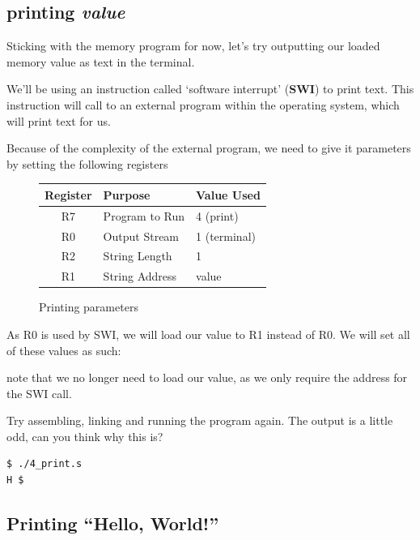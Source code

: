 \documentclass[a4paper, twocolumn, twoside, 11pt]{article}
\begin{document}
		\subsection*{printing \textit{value}}
	
			Sticking with the memory program for now, let's try outputting our loaded memory value as text in the terminal.
	
			We'll be using an instruction called `software interrupt' (\textbf{SWI}) to print text. This instruction will call to an external program within the operating system, which will print text for us.
	
			Because of the complexity of the external program, we need to give it parameters by setting the following registers
	
			\begin{figure}[h]
			\begin{tabular}{|c|l|l|}
				\hline \textbf{Register} & \textbf{Purpose} & \textbf{Value Used} \\ 
				\hline R7 & Program to Run & 4 (print) \\ 
				\hline R0 & Output Stream & 1 (terminal) \\ 
				\hline R2 & String Length & 1\\ 
				\hline R1 & String Address & value\\ 
				\hline 
			\end{tabular}
			\caption[print]{Printing parameters}
			\label{fig:print}
			\end{figure}
	
			As R0 is used by SWI, we will load our value to R1 instead of R0. We will set all of these values as such:
	
			
	
			note that we no longer need to load our value, as we only require the address for the SWI call.
	
			Try assembling, linking and running the program again. The output is a little odd, can you think why this is?
			
			\begin{lstlisting}
$ ./4_print.s
H $
			\end{lstlisting}
			
		\subsection*{Printing ``Hello, World!''}
		
\end{document}
